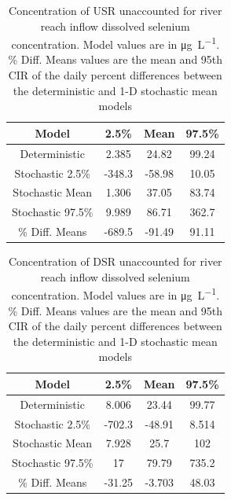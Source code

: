 \begin{linenumbers}
\begin{table}[htbp]
\centering
\caption[Concentration of USR unaccounted for river reach inflow dissolved selenium concentration..]{Concentration of USR unaccounted for river reach inflow dissolved selenium concentration.  Model values are in \si{\micro\gram\per\liter}.  \% Diff. Means values are the mean and 95th CIR of the daily percent differences between the deterministic and 1-D stochastic mean models}
\label{tab:USRUnknownCin}
\begin{tabular}{c|ccc}
	\toprule
	Model& 2.5\% & Mean & 97.5\% \\
	\midrule
	\midrule
	Deterministic&		2.385&	24.82&	99.24\\
	\midrule			                               
	Stochastic 2.5\%&	-348.3&	-58.98&	10.05\\
	Stochastic Mean&	1.306&	37.05&	83.74\\
	Stochastic 97.5\%&	9.989&	86.71&	362.7\\
	\midrule                                           
	\% Diff. Means &	-689.5&	-91.49&	91.11\\
	\bottomrule
\end{tabular}
\end{table}

\begin{table}[htbp]
\centering
\caption[Concentration of DSR unaccounted for river reach inflow dissolved selenium concentration.]{Concentration of DSR unaccounted for river reach inflow dissolved selenium concentration.  Model values are in \si{\micro\gram\per\liter}.  \% Diff. Means values are the mean and 95th CIR of the daily percent differences between the deterministic and 1-D stochastic mean models}
\label{tab:DSRUnknownCin}
\begin{tabular}{c|ccc}
	\toprule
	Model& 2.5\% & Mean & 97.5\% \\
	\midrule
	\midrule
	Deterministic&		8.006&	23.44&	99.77\\
	\midrule			                               
	Stochastic 2.5\%&	-702.3&	-48.91&	8.514\\
	Stochastic Mean&	7.928&	25.7&	102  \\
	Stochastic 97.5\%&	17&	79.79&	735.2    \\
	\midrule                                           
	\% Diff. Means &	-31.25&	-3.703&	48.03\\
	\bottomrule
\end{tabular}
\end{table}


\end{linenumbers}
